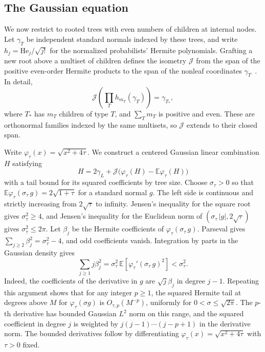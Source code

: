 \documentclass[preprints,article,submit,oneauthor]{Definitions/mdpi}
\newcommand{\E}{\mathbb E}
\newcommand{\abs}[1]{\lvert #1\rvert}
\begin{document}
\subsection{The Gaussian equation}

We now restrict to rooted trees with even numbers of children at
internal nodes. Let \(\gamma_T\) be independent standard normals
indexed by these trees, and write \(h_j=\mathrm{He}_j/\sqrt{j!}\) for
the normalized probabilists' Hermite polynomials. Grafting a new
root above a multiset of children defines the isometry \(\mathcal J\)
from the span of the positive even-order Hermite products to the
span of the nonleaf coordinates \(\gamma_T\)~\cite{CHHWY}. In detail,
\[
 \mathcal J\!\left(\prod_T h_{m_T}(\gamma_T)\right)=\gamma_{T_*},
\]
where \(T_*\) has \(m_T\) children of type \(T\), and \(\sum_T m_T\) is
positive and even. These are orthonormal families indexed by the
same multisets, so \(\mathcal J\) extends to their closed span.

Write \(\varphi_\tau(x)=\sqrt{x^2+4\tau}\). We construct a centered
Gaussian linear combination \(H\) satisfying
\begin{equation}\label{eq:gauss}
 H=2\gamma_L+\mathcal J\bigl(\varphi_\tau(H)-\E\varphi_\tau(H)\bigr)
\end{equation}
with a tail bound for its squared coefficients by tree size.
Choose \(\sigma_\tau>0\) so that \(\E\varphi_\tau(\sigma_\tau\,g)=2\sqrt{1+\tau}\)
for a standard normal \(g\). The left side is continuous and strictly
increasing from \(2\sqrt\tau\) to infinity. Jensen's inequality for
the square root gives \(\sigma_\tau^2\ge4\), and Jensen's inequality for the
Euclidean norm of \((\sigma_\tau\,\abs g, 2\sqrt\tau)\) gives \(\sigma_\tau^2\le2\pi\).
Let \(\beta_j\) be the Hermite coefficients of
\(\varphi_\tau(\sigma_\tau\,g)\). Parseval gives
\(\sum_{j\ge2}\beta_j^2=\sigma_\tau^2-4\), and odd coefficients vanish.
Integration by parts in the Gaussian density gives
\begin{equation}\label{eq:hermite-energy}
 \sum_{j\ge1} j\beta_j^2=\sigma_\tau^2\,\E\!\left[\varphi_\tau'(\sigma_\tau\,g)^2\right]<\sigma_\tau^2.
\end{equation}
Indeed, the coefficients of the derivative in \(g\) are
\(\sqrt{j}\beta_j\) in degree \(j-1\). Repeating this argument shows
that for any integer \(p\ge1\), the squared Hermite tail at degrees
above \(M\) for \(\varphi_\tau(\sigma g)\) is \(O_{\tau,p}(M^{-p})\),
uniformly for \(0<\sigma\le\sqrt{2\pi}\). The \(p\)-th derivative has bounded
Gaussian \(L^2\) norm on this range, and the squared coefficient in
degree \(j\) is weighted by \(j(j-1)\cdots(j-p+1)\) in the derivative
norm. The bounded derivatives follow by differentiating
\(\varphi_\tau(x)=\sqrt{x^2+4\tau}\) with \(\tau>0\) fixed.
\end{document}

